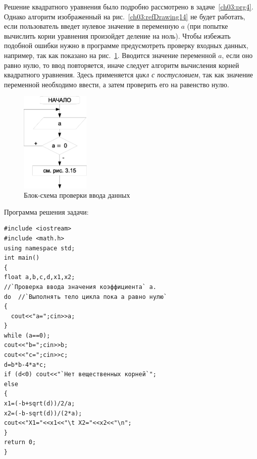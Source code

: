 
Решение квадратного уравнения было подробно рассмотрено в задаче~\ref{ch03:prg4}. Однако алгоритм изображенный 
на рис.~\ref{ch03:refDrawing14} не будет работать, если пользователь введет нулевое значение в переменную $a$ (при
попытке вычислить корни уравнения произойдет деление на ноль). Чтобы избежать подобной ошибки нужно в программе
предусмотреть проверку входных данных, например, так как показано на рис.~\ref{ch03:refDrawing26}. 
Вводится значение переменной
$a$, если оно равно нулю, то ввод повторяется, иначе следует алгоритм вычисления корней квадратного
уравнения. Здесь применяется \emph{цикл с постусловием}, так как значение переменной необходимо ввести, а
затем проверить его на равенство нулю.

\begin{figure}[htb]
\begin{center}
\includegraphics[width=0.3\textwidth]{img/ris_3_27}
\caption{Блок-схема проверки ввода данных}
\label{ch03:refDrawing26}
\end{center}
\end{figure}

Программа решения задачи:
\begin{lstlisting}
#include <iostream>
#include <math.h>
using namespace std;
int main()
{
float a,b,c,d,x1,x2;
//`Проверка ввода значения коэффициента` a.
do  //`Выполнять тело цикла пока а равно нулю`
{
  cout<<"a=";cin>>a;
}
while (a==0);
cout<<"b=";cin>>b;
cout<<"c=";cin>>c;
d=b*b-4*a*c;
if (d<0) cout<<"`Нет вещественных корней`";
else
{
x1=(-b+sqrt(d))/2/a;
x2=(-b-sqrt(d))/(2*a);
cout<<"X1="<<x1<<"\t X2="<<x2<<"\n";
}
return 0;
}
\end{lstlisting}


